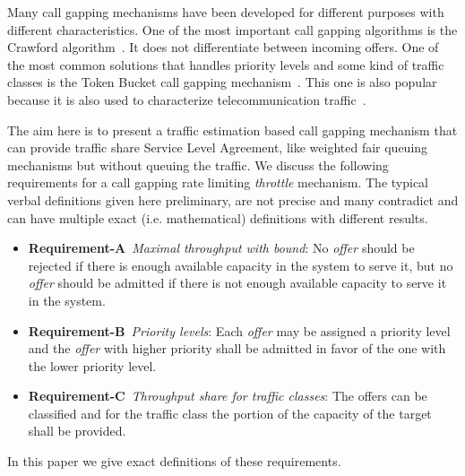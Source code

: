 \documentclass[conference]{IEEEtran}
\newcommand{\comment}[1]{}
\newcommand{\reqA}{\textbf{Requirement-A}}
\newcommand{\reqB}{\textbf{Requirement-B}}
\newcommand{\reqC}{\textbf{Requirement-C}}
\begin{document}
Many call gapping mechanisms have been developed for different
purposes with different characteristics. One of the most important
call gapping algorithms is the Crawford algorithm~\cite{CRAWFORD}.
It does not differentiate between incoming offers. One of the most
common solutions that handles priority levels and some kind of
traffic classes is the Token Bucket call gapping
mechanism~\cite{H.248.11}. This one is also popular because it is
also used to characterize telecommunication traffic~\cite{TBCHAR}.

\comment{(This work is motivated by the problem of providing
resource sharing in telecommunication networks with call gapping in
case of overload. The problem arises when concurring applications
use the same limited resource in the system i.e. processor capacity,
memory. The problem to be solved is similar to the ones solved by
Fair Queuing, Weighted Fair Queuing, General Processor
Sharing~\cite{WFQ,GPS} but the requirements and the environment is
different. The fundamental difference is that there are no queues
allowed in our case and it is desired to keep some kind of Token
Bucket property.)}

The aim here is to present a traffic estimation based call gapping
mechanism that can provide traffic share Service Level Agreement,
like weighted fair queuing mechanisms but without queuing the
traffic. We discuss the following requirements for a call gapping
rate limiting \textit{throttle} mechanism. The typical verbal
definitions given here preliminary, are not precise and many
contradict and can have multiple exact (i.e. mathematical)
definitions with different results\comment{(they are polysemantic)}.

\begin{itemize}
 \item \reqA\label{req-max-throughput}\ \textit{Maximal
throughput with bound}: No \textit{offer} should be rejected if
there is enough available capacity in the system to serve it, but no
\textit{offer} should be admitted if there  is not enough available
capacity to serve it in the system.
 \item \reqB\label{req-priority-calss}\ \textit{Priority
levels}: Each \textit{offer} may be assigned a priority level and
the \textit{offer} with higher priority shall be admitted in favor
of the one with the lower priority level.
 \item \reqC\label{req-throughput-share}\
\textit{Throughput share for traffic classes}: The offers can be
classified and for the traffic class  the  portion of the
capacity of the target shall be provided.
\end{itemize}
In this paper we give exact definitions of these requirements.
\end{document}
